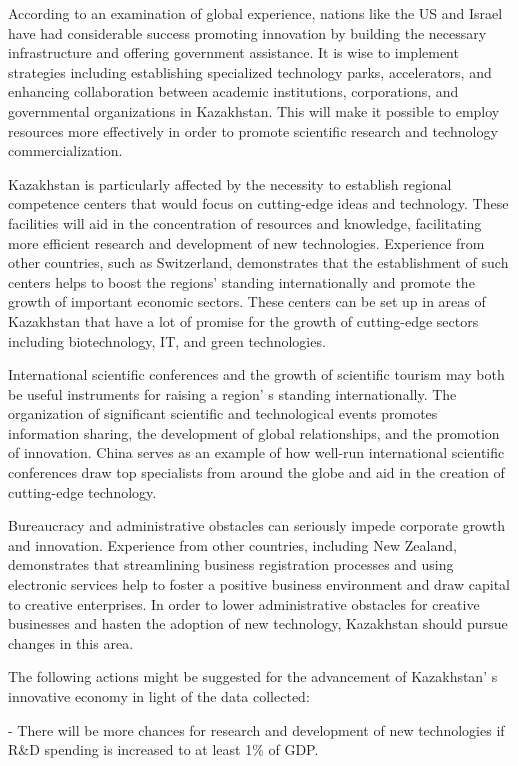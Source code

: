 \begin{multicols}{2}
According to an examination of global experience, nations like the US
and Israel have had considerable success promoting innovation by
building the necessary infrastructure and offering government
assistance. It is wise to implement strategies including establishing
specialized technology parks, accelerators, and enhancing collaboration
between academic institutions, corporations, and governmental
organizations in Kazakhstan. This will make it possible to employ
resources more effectively in order to promote scientific research and
technology commercialization.

Kazakhstan is particularly affected by the necessity to establish
regional competence centers that would focus on cutting-edge ideas and
technology. These facilities will aid in the concentration of resources
and knowledge, facilitating more efficient research and development of
new technologies. Experience from other countries, such as Switzerland,
demonstrates that the establishment of such centers helps to boost the
regions'{} standing internationally and promote the
growth of important economic sectors. These centers can be set up in
areas of Kazakhstan that have a lot of promise for the growth of
cutting-edge sectors including biotechnology, IT, and green
technologies.

International scientific conferences and the growth of scientific
tourism may both be useful instruments for raising a
region' s standing internationally. The organization of
significant scientific and technological events promotes information
sharing, the development of global relationships, and the promotion of
innovation. China serves as an example of how well-run international
scientific conferences draw top specialists from around the globe and
aid in the creation of cutting-edge technology.

Bureaucracy and administrative obstacles can seriously impede corporate
growth and innovation. Experience from other countries, including New
Zealand, demonstrates that streamlining business registration processes
and using electronic services help to foster a positive business
environment and draw capital to creative enterprises. In order to lower
administrative obstacles for creative businesses and hasten the adoption
of new technology, Kazakhstan should pursue changes in this area.

The following actions might be suggested for the advancement of
Kazakhstan' s innovative economy in light of the data
collected:

- There will be more chances for research and development of new
technologies if R\&D spending is increased to at least 1\% of GDP.


\end{multicols}
